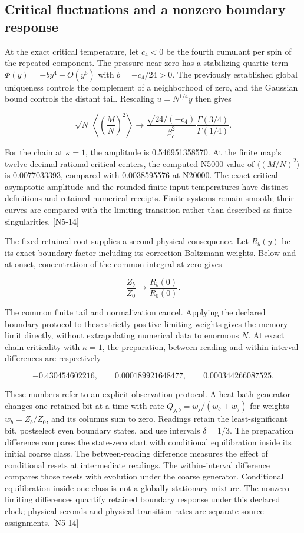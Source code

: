 \subsection{Critical fluctuations and a nonzero boundary response}\label{critical-fluctuations-and-a-nonzero-boundary-response}

At the exact critical temperature, let \(c_4<0\) be the fourth cumulant per spin of the repeated component. The pressure near zero has a stabilizing quartic term \(\Phi(y)=-by^4+O(y^6)\) with \(b=-c_4/24>0\). The previously established global uniqueness controls the complement of a neighborhood of zero, and the Gaussian bound controls the distant tail. Rescaling \(u=N^{1/4}y\) then gives

\[\sqrt N\,\left\langle\left(\frac MN\right)^2\right\rangle
\longrightarrow
\frac{\sqrt{24/(-c_4)}}{\beta_c^2}
\frac{\Gamma(3/4)}{\Gamma(1/4)}.\]

For the chain at \(\kappa=1\), the amplitude is 0.546951358570. At the finite map's twelve-decimal rational critical centers, the computed N5000 value of \(\langle(M/N)^2\rangle\) is 0.0077033393, compared with 0.0038595576 at N20000. The exact-critical asymptotic amplitude and the rounded finite input temperatures have distinct definitions and retained numerical receipts. Finite systems remain smooth; their curves are compared with the limiting transition rather than described as finite singularities. {[}N5-14{]}

The fixed retained root supplies a second physical consequence. Let \(R_b(y)\) be its exact boundary factor including its correction Boltzmann weights. Below and at onset, concentration of the common integral at zero gives

\[\frac{Z_b}{Z_0}\longrightarrow\frac{R_b(0)}{R_0(0)}.\]

The common finite tail and normalization cancel. Applying the declared boundary protocol to these strictly positive limiting weights gives the memory limit directly, without extrapolating numerical data to enormous \(N\). At exact chain criticality with \(\kappa=1\), the preparation, between-reading and within-interval differences are respectively

\[-0.430454602216,\qquad
0.000189921648477,\qquad
0.000344266087525.\]

These numbers refer to an explicit observation protocol. A heat-bath generator changes one retained bit at a time with rate \(Q_{j,b}=w_j/(w_b+w_j)\) for weights \(w_b=Z_b/Z_0\), and its columns sum to zero. Readings retain the least-significant bit, postselect even boundary states, and use intervals \(\delta=1/3\). The preparation difference compares the state-zero start with conditional equilibration inside its initial coarse class. The between-reading difference measures the effect of conditional resets at intermediate readings. The within-interval difference compares those resets with evolution under the coarse generator. Conditional equilibration inside one class is not a globally stationary mixture. The nonzero limiting differences quantify retained boundary response under this declared clock; physical seconds and physical transition rates are separate source assignments. {[}N5-14{]}

